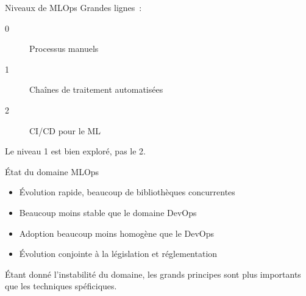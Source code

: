 \begin{frame}{Niveaux de MLOps}
  Grandes lignes~:
  \begin{description}
    \item[0] Processus manuels
    \item[1] Chaînes de traitement automatisées
    \item[2] CI/CD pour le ML
  \end{description}

  Le niveau 1 est bien exploré, pas le 2.
\end{frame}

\begin{frame}{État du domaine MLOps}
  \begin{itemize}
    \item Évolution rapide, beaucoup de bibliothèques concurrentes
    \item Beaucoup moins stable que le domaine DevOps
    \item Adoption beaucoup moins homogène que le DevOps
    \item Évolution conjointe à la législation et réglementation
  \end{itemize}

  Étant donné l'instabilité du domaine, les grands principes sont plus importants que les techniques spéficiques.
\end{frame}
